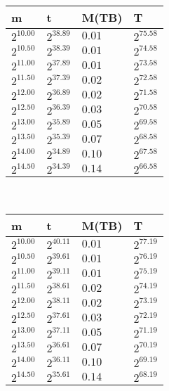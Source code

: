 \begin{tabular}{llll}
m & t & M(TB) & T \\ \hline
$2^{10.00}$ & $2^{38.89}$ & $0.01$ & $2^{75.58}$ \\
$2^{10.50}$ & $2^{38.39}$ & $0.01$ & $2^{74.58}$ \\
$2^{11.00}$ & $2^{37.89}$ & $0.01$ & $2^{73.58}$ \\
$2^{11.50}$ & $2^{37.39}$ & $0.02$ & $2^{72.58}$ \\
$2^{12.00}$ & $2^{36.89}$ & $0.02$ & $2^{71.58}$ \\
$2^{12.50}$ & $2^{36.39}$ & $0.03$ & $2^{70.58}$ \\
$2^{13.00}$ & $2^{35.89}$ & $0.05$ & $2^{69.58}$ \\
$2^{13.50}$ & $2^{35.39}$ & $0.07$ & $2^{68.58}$ \\
$2^{14.00}$ & $2^{34.89}$ & $0.10$ & $2^{67.58}$ \\
$2^{14.50}$ & $2^{34.39}$ & $0.14$ & $2^{66.58}$ \\
\end{tabular}
 \ 
\begin{tabular}{llll}
m & t & M(TB) & T \\ \hline
$2^{10.00}$ & $2^{40.11}$ & $0.01$ & $2^{77.19}$ \\
$2^{10.50}$ & $2^{39.61}$ & $0.01$ & $2^{76.19}$ \\
$2^{11.00}$ & $2^{39.11}$ & $0.01$ & $2^{75.19}$ \\
$2^{11.50}$ & $2^{38.61}$ & $0.02$ & $2^{74.19}$ \\
$2^{12.00}$ & $2^{38.11}$ & $0.02$ & $2^{73.19}$ \\
$2^{12.50}$ & $2^{37.61}$ & $0.03$ & $2^{72.19}$ \\
$2^{13.00}$ & $2^{37.11}$ & $0.05$ & $2^{71.19}$ \\
$2^{13.50}$ & $2^{36.61}$ & $0.07$ & $2^{70.19}$ \\
$2^{14.00}$ & $2^{36.11}$ & $0.10$ & $2^{69.19}$ \\
$2^{14.50}$ & $2^{35.61}$ & $0.14$ & $2^{68.19}$ \\
\end{tabular}
 \ 
